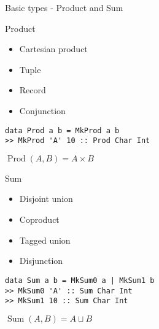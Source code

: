 \documentclass[t]{beamer}
\begin{document}
\begin{frame}[fragile]{Basic types - Product and Sum}
  \begin{minipage}[t]{0.5\textwidth}
    \begin{block}{Product}
      \begin{itemize}
        \item Cartesian product
        \item Tuple
        \item Record
        \item Conjunction
      \end{itemize}
    \end{block}

\begin{verbatim}
data Prod a b = MkProd a b
>> MkProd 'A' 10 :: Prod Char Int
\end{verbatim}
  \(
    \operatorname{Prod}(A,B) = A \times B
  \)
  \end{minipage}
  \begin{minipage}[t]{0.45\textwidth}
    \begin{block}{Sum}
      \begin{itemize}
        \item Disjoint union
        \item Coproduct
        \item Tagged union
        \item Disjunction
      \end{itemize}
    \end{block}

\begin{verbatim}
data Sum a b = MkSum0 a | MkSum1 b
>> MkSum0 'A' :: Sum Char Int
>> MkSum1 10 :: Sum Char Int
\end{verbatim}
  \(
    \operatorname{Sum}(A,B) = A \sqcup B
  \)
  \end{minipage}
\end{frame}
\end{document}
